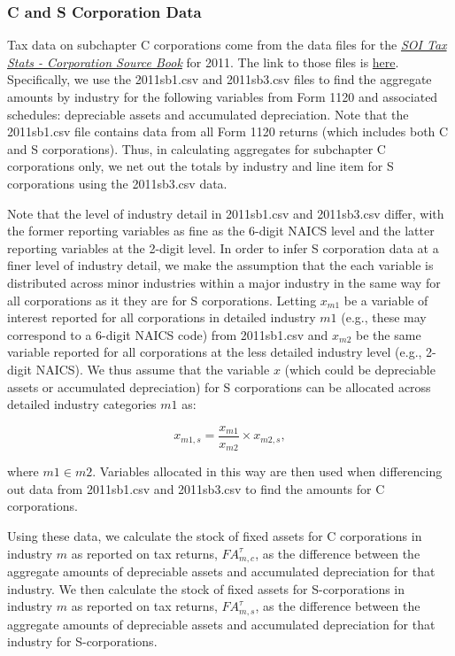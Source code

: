 \documentclass[article,11pt,letterpaper,fleqn]{article}
\theoremstyle{definition}
\numberwithin{equation}{section}
\begin{document}
\subsubsection{C and S Corporation Data}
\label{sec:CandS}

Tax data on subchapter C corporations come from the data files for the \emph{\href{http://www.irs.gov/uac/SOI-Tax-Stats-Corporation-Source-Book:-Data-File}{SOI Tax Stats - Corporation Source Book}} for 2011.  The link to those files is \href{http://www.irs.gov/uac/SOI-Tax-Stats-Corporation-Source-Book:-Data-File}{here}.  Specifically, we use the 2011sb1.csv and 2011sb3.csv files to find the aggregate amounts by industry for the following variables from Form 1120 and associated schedules: depreciable assets and accumulated depreciation.  Note that the 2011sb1.csv file contains data from all Form 1120 returns (which includes both C and S corporations).  Thus, in calculating aggregates for subchapter C corporations only, we net out the totals by industry and line item for S corporations using the 2011sb3.csv data.

Note that the level of industry detail in 2011sb1.csv and 2011sb3.csv differ, with the former reporting variables as fine as the 6-digit NAICS level and the latter reporting variables at the 2-digit level.  In order to infer S corporation data at a finer level of industry detail, we make the assumption that the each variable is distributed across minor industries within a major industry in the same way for all corporations as it they are for S corporations.  Letting $x_{m1}$ be a variable of interest reported for all corporations in detailed industry $m1$ (e.g., these may correspond to a 6-digit NAICS code) from 2011sb1.csv and $x_{m2}$ be the same variable reported for all corporations at the less detailed industry level (e.g., 2-digit NAICS).  We thus assume that the variable $x$ (which could be depreciable assets or accumulated depreciation) for S corporations can be allocated across detailed industry categories $m1$ as:

\begin{equation}
\label{eqn:attrib_minor}
x_{m1,s}=\frac{x_{m1}}{x_{m2}}\times x_{m2,s},
\end{equation}

\noindent\noindent where $m1\in m2$.  Variables allocated in this way are then used when differencing out data from 2011sb1.csv and 2011sb3.csv to find the amounts for C corporations.

Using these data, we calculate the stock of fixed assets for C corporations in industry $m$ as reported on tax returns, ${FA}^{\tau}_{m,c}$, as the difference between the aggregate amounts of depreciable assets and accumulated depreciation for that industry.  We then calculate the stock of fixed assets for S-corporations in industry $m$ as reported on tax returns, ${FA}^{\tau}_{m,s}$, as the difference between the aggregate amounts of depreciable assets and accumulated depreciation for that industry for S-corporations. 
\end{document}
